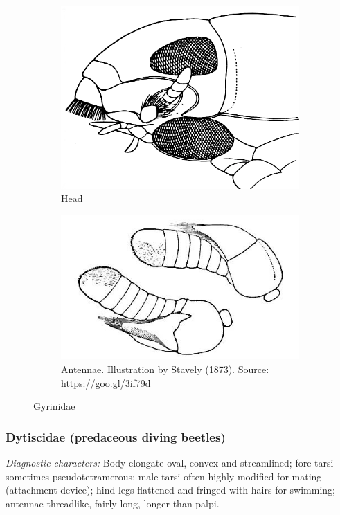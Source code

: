 \documentclass[letterpaper, 11pt]{article}
\begin{document}
\begin{figure}[ht!]
  \centering
\begin{subfigure}[ht!]{0.3\textwidth}
    \includegraphics[width=\textwidth]{gyrinidHead.png}
  \caption{Head \citep[][Fig. 13:23]{bhlitem126080aquatic}}
  \label{fig:gyrinidhead}
\end{subfigure}
    \hfill
\begin{subfigure}[ht!]{0.3\textwidth}
    \includegraphics[width=\textwidth]{GyrinidAntennae}
  \caption{Antennae. Illustration by Stavely (1873). Source: \url{https://goo.gl/3if79d}}
  \label{fig:gyrinidantenna}
\end{subfigure}
    \caption{Gyrinidae}\label{fig:gyrinids}
\end{figure}

\subsubsection{Dytiscidae (predaceous diving beetles)}
\noindent{}\textit{Diagnostic characters:} Body elongate-oval, convex and streamlined; fore tarsi sometimes pseudotetramerous; male tarsi often highly modified for mating (attachment device); hind legs flattened and fringed with hairs for swimming; antennae threadlike, fairly long, longer than palpi.\\
\end{document}
